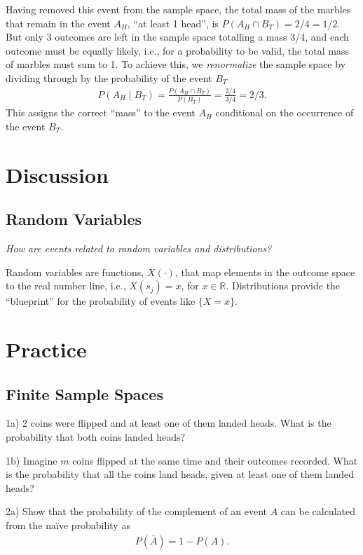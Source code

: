 Having removed this event from the sample space, 
the total mass of the marbles that remain in the event \(A_{H}\), 
``at least 1 head'', 
is \(P\left( A_{H} \cap B_{T} \right) = 2/4 = 1/2\). 
But only 3 outcomes are left in the sample space totalling a mass 3/4, 
and each outcome must be equally likely, i.e., 
for a probability to be valid, 
the total mass of marbles must sum to 1. 
To achieve this, 
we \emph{renormalize} the sample space by dividing through by 
the probability of the event \(B_{T}\)
\begin{align}
P\left( A_{H} \middle| B_{T} \right) = 
\frac{P\left( A_{H} \cap B_{T} \right)}{P(B_{T})} = 
\frac{2/4}{3/4} = 2/3.
\end{align}
This assigns the correct ``mass'' to the event \(A_{H}\) 
conditional on the occurrence of the event \(B_{T}\).

\section{Discussion}

\subsection{Random Variables}

\emph{How are events related to random variables and distributions?}

Random variables are functions, \(X(\cdot)\), 
that map elements in
the outcome space to the real number line, i.e., \(X(s_j) = x\), for \(x \in \mathbb{R}\).
Distributions provide the ``blueprint'' for the probability of events like \(\{X=x\}\).

\section{Practice}

\subsection{Finite Sample Spaces}

1a) 2 coins were flipped and at least one of them landed heads. 
What is the probability that both coins landed heads?

1b) Imagine \(m\) coins flipped at the same time and their outcomes recorded. 
What is the probability that all the coins land heads, 
given at least one of them landed heads?

2a) Show that the probability of the complement of an event \(A\) 
can be calculated from the naïve probability as
\begin{align}
P\left( \overline{A} \right) = 1 - P(A).
\end{align}

